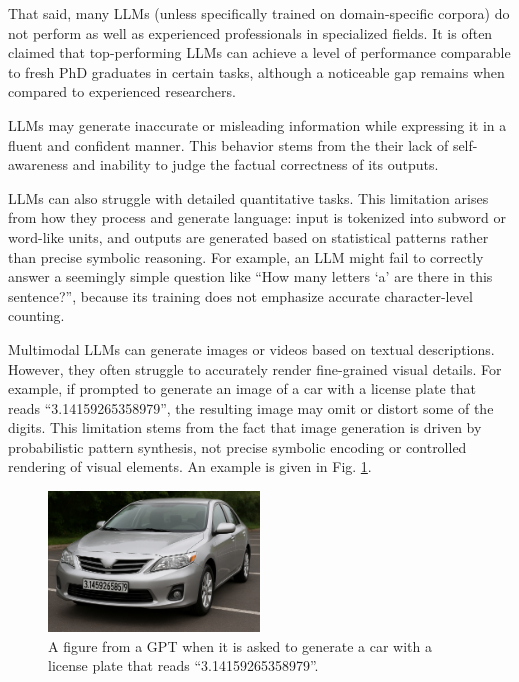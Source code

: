 That said, many LLMs (unless specifically trained on domain-specific corpora) do not perform as well as experienced professionals in specialized fields. It is often claimed that top-performing LLMs can achieve a level of performance comparable to fresh PhD graduates in certain tasks, although a noticeable gap remains when compared to experienced researchers.

LLMs may generate inaccurate or misleading information while expressing it in a fluent and confident manner. This behavior stems from the their lack of self-awareness and inability to judge the factual correctness of its outputs.

LLMs can also struggle with detailed quantitative tasks. This limitation arises from how they process and generate language: input is tokenized into subword or word-like units, and outputs are generated based on statistical patterns rather than precise symbolic reasoning. For example, an LLM might fail to correctly answer a seemingly simple question like ``How many letters `a' are there in this sentence?'', because its training does not emphasize accurate character-level counting.

Multimodal LLMs can generate images or videos based on textual descriptions. However, they often struggle to accurately render fine-grained visual details. For example, if prompted to generate an image of a car with a license plate that reads ``3.14159265358979'', the resulting image may omit or distort some of the digits. This limitation stems from the fact that image generation is driven by probabilistic pattern synthesis, not precise symbolic encoding or controlled rendering of visual elements. An example is given in Fig. \ref{fig:gpt_carplate}.

\begin{figure}[!htb]
	\centering
	\includegraphics[width=0.5\textwidth]{./chapters/part-7/figures/gpt_carplate.png}
	\caption{A figure from a GPT when it is asked to generate a car with a license plate that reads ``3.14159265358979''.}
	\label{fig:gpt_carplate}
\end{figure}

